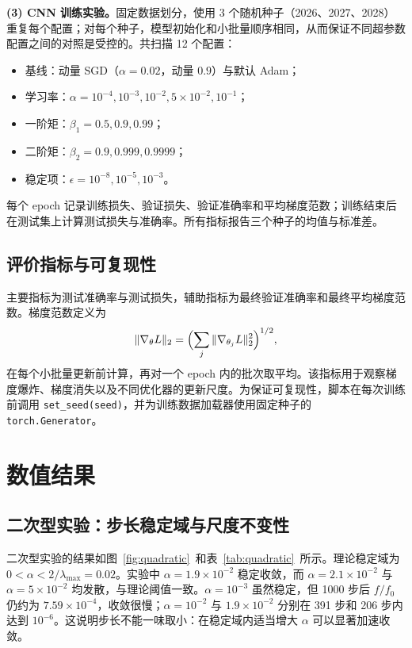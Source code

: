 \documentclass[12pt,a4paper]{ctexart}
\begin{document}
\textbf{(3) CNN 训练实验。}固定数据划分，使用 3 个随机种子（2026、2027、2028）重复每个配置；对每个种子，模型初始化和小批量顺序相同，从而保证不同超参数配置之间的对照是受控的。共扫描 12 个配置：
\begin{itemize}[itemsep=0.2em]
\item 基线：动量 SGD（$\alpha=0.02$，动量 $0.9$）与默认 Adam；
\item 学习率：$\alpha=10^{-4},10^{-3},10^{-2},5\times10^{-2},10^{-1}$；
\item 一阶矩：$\beta_1=0.5,0.9,0.99$；
\item 二阶矩：$\beta_2=0.9,0.999,0.9999$；
\item 稳定项：$\epsilon=10^{-8},10^{-5},10^{-3}$。
\end{itemize}
每个 epoch 记录训练损失、验证损失、验证准确率和平均梯度范数；训练结束后在测试集上计算测试损失与准确率。所有指标报告三个种子的均值与标准差。

\subsection{评价指标与可复现性}
主要指标为测试准确率与测试损失，辅助指标为最终验证准确率和最终平均梯度范数。梯度范数定义为
\begin{equation}
\|\nabla_\theta L\|_2=\Bigl(\sum_{j}\|\nabla_{\theta_j}L\|_2^2\Bigr)^{1/2},
\end{equation}
在每个小批量更新前计算，再对一个 epoch 内的批次取平均。该指标用于观察梯度爆炸、梯度消失以及不同优化器的更新尺度。为保证可复现性，脚本在每次训练前调用 \texttt{set\_seed(seed)}，并为训练数据加载器使用固定种子的 \texttt{torch.Generator}。

\section{数值结果}

\subsection{二次型实验：步长稳定域与尺度不变性}
二次型实验的结果如图~\ref{fig:quadratic}~和表~\ref{tab:quadratic}~所示。理论稳定域为 $0<\alpha<2/\lambda_{\max}=0.02$。实验中 $\alpha=1.9\times10^{-2}$ 稳定收敛，而 $\alpha=2.1\times10^{-2}$ 与 $\alpha=5\times10^{-2}$ 均发散，与理论阈值一致。$\alpha=10^{-3}$ 虽然稳定，但 1000 步后 $f/f_0$ 仍约为 $7.59\times10^{-4}$，收敛很慢；$\alpha=10^{-2}$ 与 $1.9\times10^{-2}$ 分别在 391 步和 206 步内达到 $10^{-6}$。这说明步长不能一味取小：在稳定域内适当增大 $\alpha$ 可以显著加速收敛。
\end{document}
